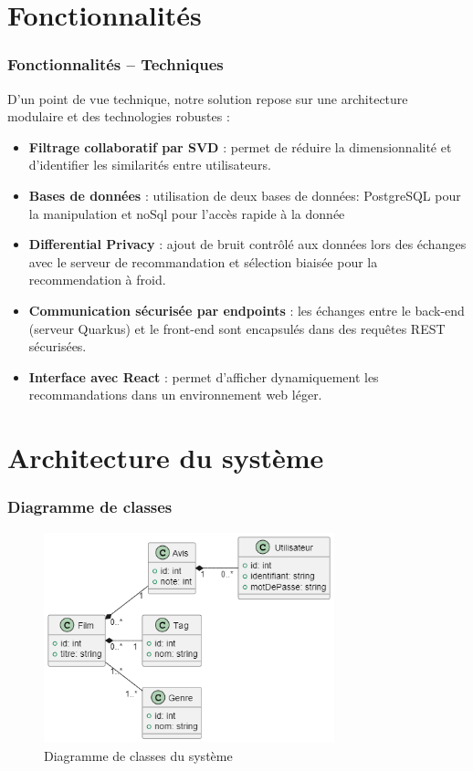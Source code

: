 \documentclass{beamer}
\begin{document}
\section{Fonctionnalités}
\begin{frame}
    \frametitle{Fonctionnalités – Techniques}
    \small
    D’un point de vue technique, notre solution repose sur une architecture modulaire et des technologies robustes :

    \begin{itemize}
        \item \textbf{Filtrage collaboratif par SVD} : permet de réduire la dimensionnalité et d’identifier les similarités entre utilisateurs.
        \item \textbf{Bases de données} : utilisation de deux bases de données: PostgreSQL pour la manipulation et noSql pour l'accès rapide à la donnée
        \item \textbf{Differential Privacy} : ajout de bruit contrôlé aux données lors des échanges avec le serveur de recommandation et sélection biaisée pour la recommendation à froid.
        \item \textbf{Communication sécurisée par endpoints} : les échanges entre le back-end (serveur Quarkus) et le front-end sont encapsulés dans des requêtes REST sécurisées.
        \item \textbf{Interface avec React} : permet d’afficher dynamiquement les recommandations dans un environnement web léger.
    \end{itemize}

\end{frame}

\section{Architecture du système}
\begin{frame}
    \frametitle{Diagramme de classes}
    \vspace{0.5cm}
    \begin{figure}
        \centering
        \includegraphics[width=0.75\textwidth]{classe.png}
        \caption{\small Diagramme de classes du système}
    \end{figure}
\end{frame}
\end{document}
